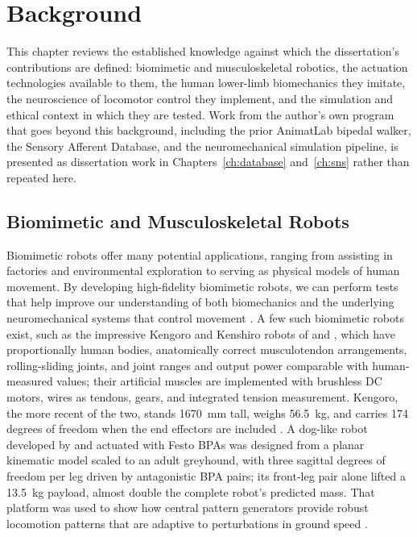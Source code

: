 \chapter{Background}\label{ch:background}
\graphicspath{{../Figures/15-background/}{figs/15-background/}}

This chapter reviews the established knowledge against which the dissertation's contributions are defined: biomimetic and musculoskeletal robotics, the actuation technologies available to them, the human lower-limb biomechanics they imitate, the neuroscience of locomotor control they implement, and the simulation and ethical context in which they are tested. Work from the author's own program that goes beyond this background, including the prior AnimatLab bipedal walker, the Sensory Afferent Database, and the neuromechanical simulation pipeline, is presented as dissertation work in Chapters~\ref{ch:database} and~\ref{ch:sns} rather than repeated here.

\section{Biomimetic and Musculoskeletal Robots}\label{sec:bg_robots}

Biomimetic robots offer many potential applications, ranging from assisting in factories and environmental exploration to serving as physical models of human movement. By developing high-fidelity biomimetic robots, we can perform tests that help improve our understanding of both biomechanics and the underlying neuromechanical systems that control movement \citep{shin_constructive_2018, asano_musculoskeletal_2019, ijspeert_amphibious_2020, goldsmith_investigating_2021, hunt_development_2017, schilling_adaptive_2022}. A few such biomimetic robots exist, such as the impressive Kengoro and Kenshiro robots of \citet{asano_design_2017} and \citet{asano_musculoskeletal_2019}, which have proportionally human bodies, anatomically correct musculotendon arrangements, rolling-sliding joints, and joint ranges and output power comparable with human-measured values; their artificial muscles are implemented with brushless DC motors, wires as tendons, gears, and integrated tension measurement. Kengoro, the more recent of the two, stands \qty{1670}{\mm} tall, weighs \qty{56.5}{\kg}, and carries 174 degrees of freedom when the end effectors are included \citep{asano_design_2017}. A dog-like robot developed by \citet{aschenbeck_design_2006} and actuated with Festo BPAs was designed from a planar kinematic model scaled to an adult greyhound, with three sagittal degrees of freedom per leg driven by antagonistic BPA pairs; its front-leg pair alone lifted a \qty{13.5}{\kg} payload, almost double the complete robot's predicted mass. That platform was used to show how central pattern generators provide robust locomotion patterns that are adaptive to perturbations in ground speed \citep{hunt_development_2017}.

